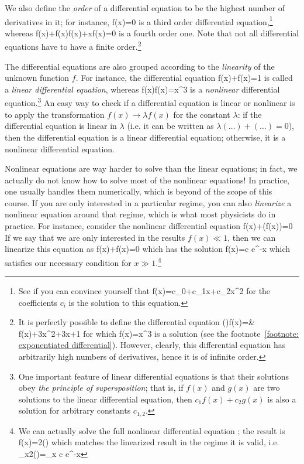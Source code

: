 We also define the \emph{order} of a differential equation to be the highest number of derivatives in it; for instance,
\be 
{}f(x)=0
\ee 
is a third order differential equation,\footnote{
See if you can convince yourself that 
\be 
f(x)=c_0+c_1x+c_2x^2
\ee 
for the coefficients $c_i$ is the solution to this equation.
} whereas
\be 
{}f(x)+f(x)f(x)+xf(x)=0
\ee 
is a fourth order one. Note that not all differential equations have to have a finite order.\footnote{
It is perfectly possible to define the differential equation
\be 
\exp()f(x)={}& f(x)+3x^2+3x+1
\ee 
for which 
\be 
f(x)=x^3
\ee 
is a solution (see the footnote~\ref{footnote: exponentiated differential}). However, clearly, this differential equation has arbitrarily high numbers of derivatives, hence it is of infinite order.
}

The differential equations are also grouped according to the \emph{linearity} of the unknown function $f$. For instance, the differential equation
\be 
{}f(x)+f(x)=1
\ee 
is called a \emph{linear differential equation}, whereas
\be 
f(x)f(x)=x^3
\ee 
is a \emph{nonlinear} differential equation.\footnote{\label{footnote:superposition}
One important feature of linear differential equations is that their solutions obey \emph{the principle of supersposition}; that is, if $f(x)$ and $g(x)$ are two solutions to the linear differential equation, then $c_1f(x)+c_2g(x)$ is also a solution for arbitrary constants $c_{1,2}$.
} An easy way to check if a differential equation is linear or nonlinear is to apply the transformation $f(x)\rightarrow \lambda f(x)$ for the constant $\lambda$: if the differential equation is linear in $\lambda$ (i.e. it can be written as $\lambda(\dots)+(\dots)=0$), then the differential equation is a linear differential equation; otherwise, it is a nonlinear differential equation.

Nonlinear equations are way harder to solve than the linear equations; in fact, we actually do not know how to solve most of the nonlinear equations! In practice, one usually handles them numerically, which is beyond of the scope of this course. If you are only interested in a particular regime, you can also \emph{linearize} a nonlinear equation around that regime, which is what most physicists do in practice. For instance, consider the nonlinear differential equation
\be 
\label{eq: nonlinear example}
f(x)+\sin(f(x))=0
\ee 
If we say that we are only interested in the results $f(x)\ll1$, then we can linearize this equation as 
\be 
{}f(x)+f(x)=0
\ee 
which has the solution
\be 
f(x)=c e^{-x}
\ee 
which satisfies our necessary condition for $x\gg 1$.\footnote{
We can actually solve the full nonlinear differential equation ; the result is
\be 
f(x)=2\arccot()
\ee 
which matches the linearized result in the regime it is valid, i.e. 
\be 
\lim\limits_{x\rightarrow\infty}2\arccot()=\lim\limits_{x\rightarrow\infty} c e^{-x}
\ee 
}

